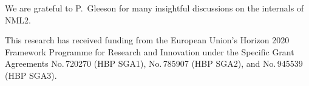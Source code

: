 \documentclass{beamer}
\begin{document}
\begin{frame}[t, fragile]
\begin{columns}
\begin{column}{0.49\textwidth}
      We are grateful to P.~Gleeson for many insightful discussions on the
      internals of NML2.

      This research has received funding from the European Union's Horizon 2020
      Framework Programme for Research and Innovation under the Specific Grant
      Agreements No.\,720270 (HBP SGA1), No.\,785907 (HBP SGA2), and No.\,945539
      (HBP SGA3).
    \end{column}
  \end{columns}
\end{frame}
\end{document}
